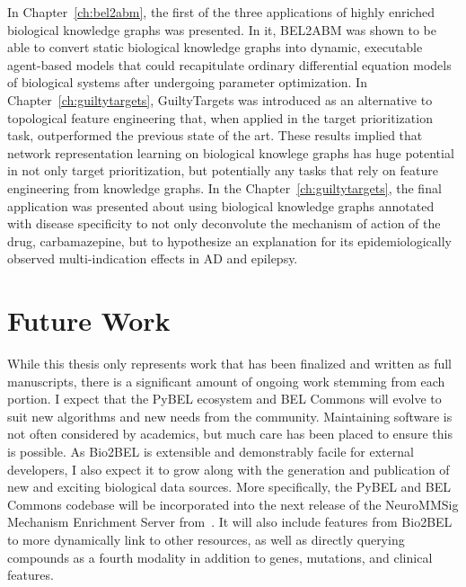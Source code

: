 In Chapter~\ref{ch:bel2abm}, the first of the three applications of highly enriched biological knowledge graphs was presented.
In it, BEL2ABM was shown to be able to convert static biological knowledge graphs into dynamic, executable agent-based models that could recapitulate ordinary differential equation models of biological systems after undergoing parameter optimization.
In Chapter~\ref{ch:guiltytargets}, GuiltyTargets was introduced as an alternative to topological feature engineering that, when applied in the target prioritization task, outperformed the previous state of the art.
These results implied that network representation learning on biological knowlege graphs has huge potential in not only target prioritization, but potentially any tasks that rely on feature engineering from knowledge graphs.
In the Chapter~\ref{ch:guiltytargets}, the final application was presented about using biological knowledge graphs annotated with disease specificity to not only deconvolute the mechanism of action of the drug, carbamazepine, but to hypothesize an explanation for its epidemiologically observed multi-indication effects in \ac{AD} and epilepsy.

\section{Future Work}

While this thesis only represents work that has been finalized and written as full manuscripts, there is a significant amount of ongoing work stemming from each portion.
I expect that the PyBEL ecosystem and BEL Commons will evolve to suit new algorithms and new needs from the community.
Maintaining software is not often considered by academics, but much care has been placed to ensure this is possible.
As Bio2BEL is extensible and demonstrably facile for external developers, I also expect it to grow along with the generation and publication of new and exciting biological data sources.
More specifically, the PyBEL and BEL Commons codebase will be incorporated into the next release of the NeuroMMSig Mechanism Enrichment Server from~\cite{Domingo-Fernandez2017}.
It will also include features from Bio2BEL to more dynamically link to other resources, as well as directly querying compounds as a fourth modality in addition to genes, mutations, and clinical features.

